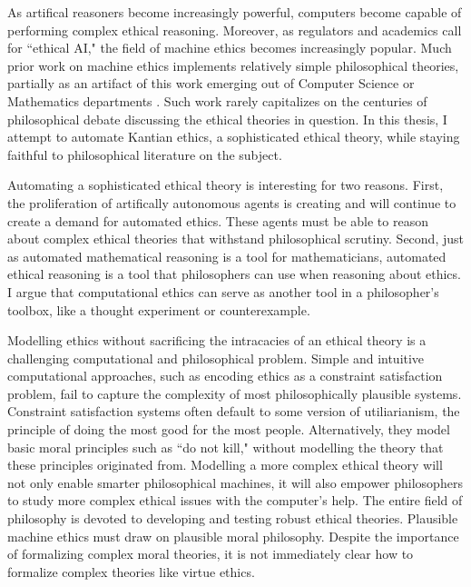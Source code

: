 %
\begin{isabellebody}%
%
%
\isadelimtheory
%
\endisadelimtheory
%
\isatagtheory
%
\endisatagtheory
{\isafoldtheory}%
%
\isadelimtheory
%
\endisadelimtheory
%
\isadelimdocument
%
\endisadelimdocument
%
\isatagdocument
%
\isamarkuptrue%
%
\endisatagdocument
{\isafolddocument}%
%
\isadelimdocument
%
\endisadelimdocument
%
\begin{isamarkuptext}%
As artifical reasoners become increasingly powerful, computers become capable of
performing complex ethical reasoning. Moreover, as regulators and academics call for ``ethical AI,"
the field of machine ethics becomes increasingly popular. Much prior work on machine ethics implements
relatively simple philosophical theories, partially as an artifact of this work emerging out of
Computer Science or Mathematics departments \cite{mesurvey}. Such work rarely capitalizes on the 
centuries of philosophical debate discussing the ethical theories in question. In this thesis, I attempt
to automate Kantian ethics, a sophisticated ethical theory, while staying faithful to philosophical
literature on the subject.

Automating a sophisticated ethical theory is interesting for two reasons. First, the proliferation of 
artifically autonomous agents is creating and will continue to create a demand for 
automated ethics. These agents must be able to reason about complex ethical theories 
that withstand philosophical scrutiny. Second, just as automated mathematical reasoning is a tool
for mathematicians, automated ethical reasoning is a tool that philosophers can use 
when reasoning about ethics. I argue that computational ethics can serve as another tool in a 
philosopher's toolbox, like a thought experiment or counterexample.

Modelling ethics without sacrificing the intracacies of an ethical theory is a 
challenging computational and philosophical problem. Simple and intuitive computational approaches, 
such as encoding ethics as a constraint satisfaction problem, fail to capture
the complexity of most philosophically plausible systems. Constraint satisfaction systems often default to some version of utiliarianism, 
the principle of doing the most good for the most people. Alternatively, they model basic moral 
principles such as ``do not kill," without modelling the theory that these principles originated from.
Modelling a more complex ethical theory will not only enable smarter philosophical machines, it will
also empower philosophers to study more complex ethical issues with the computer's help. The entire
field of philosophy is devoted to developing and testing robust ethical theories. Plausible machine
ethics must draw on plausible moral philosophy. Despite the importance of formalizing complex moral theories,
it is not immediately clear how to formalize complex theories like virtue ethics.


\end{isamarkuptext}
\end{isabellebody}
